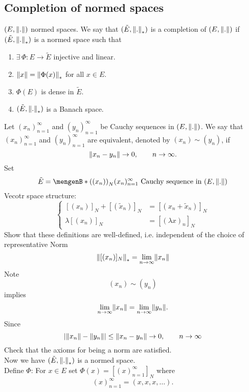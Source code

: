 \subsection{Completion of normed spaces} 
\label{sub:completion_of_normed_spaces}
$(E,\norm{.})$ normed spaces. We say that $(\tilde E, \norm{.}_*)$ is a completion of $(E,\norm{.})$ if $(\tilde E, \norm{.}_*)$ is a normed space such that
\begin{enumerate}[(1)]
	\item $\exists\, \Phi: E \to \tilde E$ injective and linear.
	\item $\norm{x} = \norm{\Phi(x)}_*$ for all $x \in E$.
	\item $\Phi(E)$ is dense in $\tilde E$.
	\item $(\tilde E, \norm{.}_*)$ is a Banach space.
\end{enumerate}
Let $(x_n)_{n=1}^{\infty}$ and $(y_n)_{n=1}^{\infty}$ be Cauchy sequences in $(E,\norm{.})$. We say that $(x_n)_{n=1}^{\infty}$ and $(y_n)_{n=1}^{\infty}$ are equivalent, denoted by $(x_n) \sim (y_n)$, if 
\[
	\norm{x_n-y_n} \to 0, \qquad n \to \infty.
\]
Set \[
	\tilde E= \set[ \left((x_n) \right)_N]{(x_n)_{n=1}^{\infty} \text{ Cauchy sequence in } (E,\norm{.})}
\]
Vecotr space structure:
\[
	\begin{cases}
		[(x_n)]_N + [(\tilde x_n)]_N &= [(x_n + \tilde x_n)]_N \\
		\lambda [(x_n)]_N &= [(\lambda x)_n]_N
	\end{cases}
\]
Show that these definitions are well-defined, i.e. independent of the choice of representative Norm
\[
	\norm{ [(x_n)]_N}_* = \lim_{n \to \infty} \norm{x_n}
\]
Note \[
	(x_n) \sim (y_n)
\]
implies
\[
	\lim_{n \to \infty}\norm{x_n} = \lim_{n \to \infty} \norm{y_n}.
\]
Since
\[
	\abs{\norm{x_n}- \norm{y_n}} \leq \norm{x_n-y_n} \to 0, \qquad n \to \infty
\]
Check that the axioms for being a norm are satisfied. \\
Now we have $(\tilde E,\norm{.}_*)$ is a normed space. \\
Define $\Phi$: For $x \in E$ set $\Phi(x) = \left[ (x)_{n=1}^{\infty} \right]_N$ where 
\[
	(x)_{n=1}^{\infty} = (x,x,x, \dots).
\]
